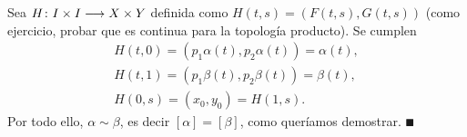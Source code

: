 \documentclass[GTS.tex]{subfiles}
\begin{document}
\begin{dem}
\begin{itemize}
Sea $H\colon{I\times I}\longrightarrow{X\times Y}$ definida como $H(t,s)=(F(t,s),G(t,s))$ (como ejercicio, probar que es continua para la topología producto). Se cumplen
\begin{gather*}
H(t,0)=(p_1\alpha(t),p_2\alpha(t))=\alpha(t),\\
H(t,1)=(p_1\beta(t),p_2\beta(t))=\beta(t),\\
H(0,s)=(x_0,y_0)=H(1,s).
\end{gather*}
Por todo ello, $\alpha\sim\beta$, es decir $[\alpha]=[\beta]$, como queríamos demostrar. $\QED$
\end{itemize}
\end{dem}
\end{document}
